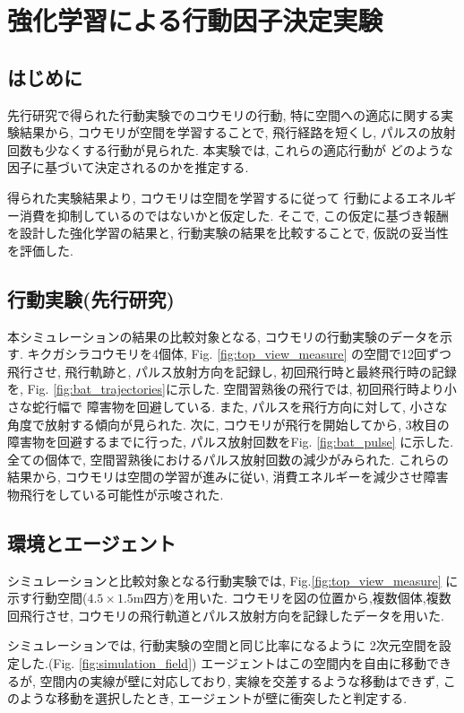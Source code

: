 \documentclass[../main]{subfiles}
\begin{document}
\newpage
\chapter{強化学習による行動因子決定実験}
\label{chap:simulation}

\section{はじめに}
先行研究で得られた行動実験でのコウモリの行動, 
特に空間への適応に関する実験結果から, 
コウモリが空間を学習することで, 飛行経路を短くし, 
パルスの放射回数も少なくする行動が見られた.
本実験では, これらの適応行動が
どのような因子に基づいて決定されるのかを推定する.

得られた実験結果より,
コウモリは空間を学習するに従って
行動によるエネルギー消費を抑制しているのではないかと仮定した.
そこで, この仮定に基づき報酬を設計した強化学習の結果と, 
行動実験の結果を比較することで, 仮説の妥当性を評価した.


\section{行動実験(先行研究)}
本シミュレーションの結果の比較対象となる, 
コウモリの行動実験のデータを示す.
キクガシラコウモリを4個体, Fig. \ref{fig:top_view_measure}
の空間で12回ずつ飛行させ, 
飛行軌跡と, パルス放射方向を記録し, 
初回飛行時と最終飛行時の記録を, 
Fig. \ref{fig:bat_trajectories}に示した.
空間習熟後の飛行では, 初回飛行時より小さな蛇行幅で
障害物を回避している. 
また, パルスを飛行方向に対して, 
小さな角度で放射する傾向が見られた.
次に, コウモリが飛行を開始してから, 
3枚目の障害物を回避するまでに行った, 
パルス放射回数をFig. \ref{fig:bat_pulse}
に示した.
全ての個体で, 空間習熟後におけるパルス放射回数の減少がみられた.
これらの結果から, コウモリは空間の学習が進みに従い, 
消費エネルギーを減少させ障害物飛行をしている可能性が示唆された.


\section{環境とエージェント}
シミュレーションと比較対象となる行動実験では,
Fig.\ref{fig:top_view_measure}
に示す行動空間($4.5 \times 1.5$\si{m}四方)を用いた.
コウモリを図の位置から,複数個体,複数回飛行させ,
コウモリの飛行軌道とパルス放射方向を記録したデータを用いた.

シミュレーションでは, 行動実験の空間と同じ比率になるように
2次元空間を設定した.(Fig. \ref{fig:simulation_field})
エージェントはこの空間内を自由に移動できるが,
空間内の実線が壁に対応しており,
実線を交差するような移動はできず, 
このような移動を選択したとき, 
エージェントが壁に衝突したと判定する.
\end{document}
